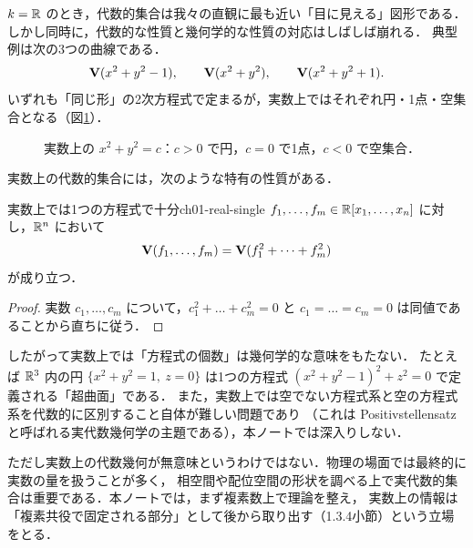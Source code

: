 $k=\mathbb{R}$ のとき，代数的集合は我々の直観に最も近い「目に見える」図形である．
しかし同時に，代数的な性質と幾何学的な性質の対応はしばしば崩れる．
典型例は次の3つの曲線である．
\[
  \mathbf{V}(x^2+y^2-1),\qquad \mathbf{V}(x^2+y^2),\qquad \mathbf{V}(x^2+y^2+1).
\]
いずれも「同じ形」の2次方程式で定まるが，実数上ではそれぞれ円・1点・空集合となる（図\ref{fig:ch01-real-circles}）．

\begin{figure}[H]
\centering
{}
\caption{実数上の $x^2+y^2=c$：$c>0$ で円，$c=0$ で1点，$c<0$ で空集合．}
\label{fig:ch01-real-circles}
\end{figure}

実数上の代数的集合には，次のような特有の性質がある．

\begin{myprop}{実数上では1つの方程式で十分}{ch01-real-single}
$f_1,\dots,f_m\in\mathbb{R}[x_1,\dots,x_n]$ に対し，$\mathbb{R}^n$ において
\[
  \mathbf{V}(f_1,\dots,f_m)=\mathbf{V}(f_1^2+\dots+f_m^2)
\]
が成り立つ．
\end{myprop}

\begin{proof}
実数 $c_1,\dots,c_m$ について，$c_1^2+\dots+c_m^2=0$ と $c_1=\dots=c_m=0$ は同値であることから直ちに従う．
\end{proof}

したがって実数上では「方程式の個数」は幾何学的な意味をもたない．
たとえば $\mathbb{R}^3$ 内の円 $\{x^2+y^2=1,\ z=0\}$ は1つの方程式 $(x^2+y^2-1)^2+z^2=0$ で定義される「超曲面」である．
また，実数上では空でない方程式系と空の方程式系を代数的に区別すること自体が難しい問題であり
（これは Positivstellensatz と呼ばれる実代数幾何学の主題である），本ノートでは深入りしない．

ただし実数上の代数幾何が無意味というわけではない．物理の場面では最終的に実数の量を扱うことが多く，
相空間や配位空間の形状を調べる上で実代数的集合は重要である．本ノートでは，まず複素数上で理論を整え，
実数上の情報は「複素共役で固定される部分」として後から取り出す（1.3.4小節）という立場をとる．

